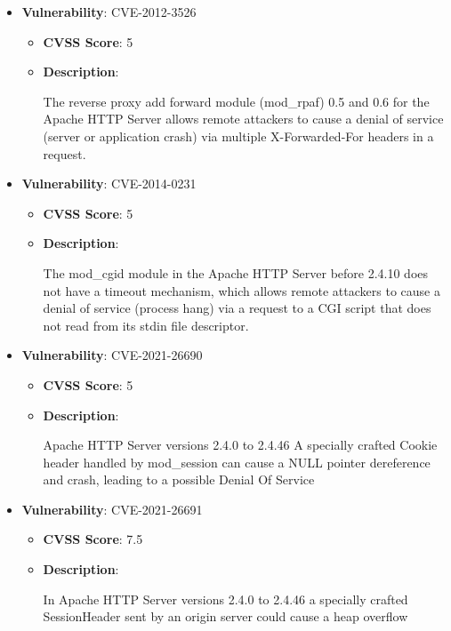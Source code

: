 \documentclass{article}
\begin{document}
\begin{itemize}
        \item \textbf{Vulnerability}: CVE-2012-3526
        \begin{itemize}
            \item \textbf{CVSS Score}:  5 
            \item \textbf{Description}:
            \parbox[t]{0.9\linewidth}{
                \ttfamily The reverse proxy add forward module (mod\_rpaf) 0.5 and 0.6 for the Apache HTTP Server allows remote attackers to cause a denial of service (server or application crash) via multiple X-Forwarded-For headers in a request.
            }
        \end{itemize}
    
        \item \textbf{Vulnerability}: CVE-2014-0231
        \begin{itemize}
            \item \textbf{CVSS Score}:  5 
            \item \textbf{Description}:
            \parbox[t]{0.9\linewidth}{
                \ttfamily The mod\_cgid module in the Apache HTTP Server before 2.4.10 does not have a timeout mechanism, which allows remote attackers to cause a denial of service (process hang) via a request to a CGI script that does not read from its stdin file descriptor.
            }
        \end{itemize}
    
        \item \textbf{Vulnerability}: CVE-2021-26690
        \begin{itemize}
            \item \textbf{CVSS Score}:  5 
            \item \textbf{Description}:
            \parbox[t]{0.9\linewidth}{
                \ttfamily Apache HTTP Server versions 2.4.0 to 2.4.46 A specially crafted Cookie header handled by mod\_session can cause a NULL pointer dereference and crash, leading to a possible Denial Of Service
            }
        \end{itemize}
    
        \item \textbf{Vulnerability}: CVE-2021-26691
        \begin{itemize}
            \item \textbf{CVSS Score}:  7.5 
            \item \textbf{Description}:
            \parbox[t]{0.9\linewidth}{
                \ttfamily In Apache HTTP Server versions 2.4.0 to 2.4.46 a specially crafted SessionHeader sent by an origin server could cause a heap overflow
            }
        \end{itemize}
    

\end{itemize}
\end{document}
